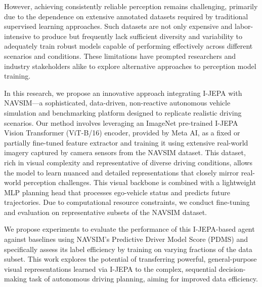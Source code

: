 \documentclass{article}
\begin{document}
However, achieving consistently reliable perception remains challenging, primarily due to the dependence on extensive annotated datasets required by traditional supervised learning approaches. Such datasets are not only expensive and labor-intensive to produce but frequently lack sufficient diversity and variability to adequately train robust models capable of performing effectively across different scenarios and conditions. These limitations have prompted researchers and industry stakeholders alike to explore alternative approaches to perception model training.

In this research, we propose an innovative approach integrating I-JEPA with NAVSIM—a sophisticated, data-driven, non-reactive autonomous vehicle simulation and benchmarking platform designed to replicate realistic driving scenarios. Our method involves leveraging an ImageNet pre-trained I-JEPA Vision Transformer (ViT-B/16) encoder, provided by Meta AI, as a fixed or partially fine-tuned feature extractor and training it using extensive real-world imagery captured by camera sensors from the NAVSIM dataset. This dataset, rich in visual complexity and representative of diverse driving conditions, allows the model to learn nuanced and detailed representations that closely mirror real-world perception challenges. This visual backbone is combined with a lightweight MLP planning head that processes ego-vehicle status and predicts future trajectories. Due to computational resource constraints, we conduct fine-tuning and evaluation on representative subsets of the NAVSIM dataset. 

We propose experiments to evaluate the performance of this I-JEPA-based agent against baselines using NAVSIM's Predictive Driver Model Score (PDMS) and specifically assess its label efficiency by training on varying fractions of the data subset. This work explores the potential of transferring powerful, general-purpose visual representations learned via I-JEPA to the complex, sequential decision-making task of autonomous driving planning, aiming for improved data efficiency.

\end{document}
